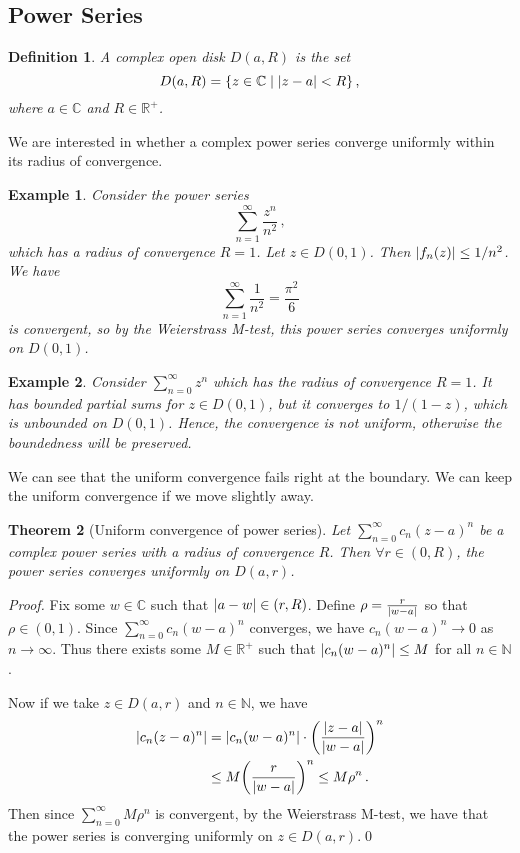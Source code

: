 \documentclass{article}
\theoremstyle{plain}\theoremheaderfont{\normalfont\itshape}\theorembodyfont{\rmfamily}\theoremseparator{.}\newtheorem*{rem}{Remark}\newtheorem*{ex}{Example}\newtheorem*{proof}{Proof}\newtheorem*{altp}{Alternative proof}
\theoremstyle{plain}\theoremheaderfont{\normalfont\bfseries}\theorembodyfont{\rmfamily}\theoremseparator{.}\newtheorem{thm}{Theorem}[section]\newtheorem{lem}[thm]{Lemma}\newtheorem{prop}[thm]{Proposition}\newtheorem*{cor}{Corollary}\newtheorem{defn}[thm]{Definition}\newtheorem{clm}[thm]{Claim}\newtheorem{clminproof}{Claim}
\theoremstyle{break}\theoremheaderfont{\normalfont\itshape}\theorembodyfont{\rmfamily}\theoremseparator{.\medskip}\newtheorem*{proofskip}{Proof}\newtheorem*{exs}{Examples}\newtheorem*{rems}{Remarks}
\theoremstyle{break}\theoremheaderfont{\normalfont\bfseries}\theorembodyfont{\rmfamily}\theoremseparator{.\medskip}\newtheorem{lemskip}[thm]{Lemma}\newtheorem{defnskip}[thm]{Definition}\newtheorem{propskip}[thm]{Proposition}\newtheorem{thmskip}[thm]{Theorem}
\newcommand{\qed}{\hfill\ensuremath{\Box}}
\begin{document}
    \subsection{Power Series}
    \begin{defn}
        A complex open disk \(D(a,R)\) is the set
        \[D(a,R)=\{z\in\mathbb{C}\mid\abs{z-a}<R\}\,,\]
        where \(a\in\mathbb{C}\) and \(R\in\mathbb{R}^+\).
    \end{defn}

    We are interested in whether a complex power series converge uniformly within its radius of convergence.

    \begin{ex}
        Consider the power series
        \[\sum_{n=1}^{\infty}\frac{z^n}{n^2}\,,\]
        which has a radius of convergence \(R=1\). Let \(z\in D(0,1)\). Then \(\abs{f_n(z)}\le 1/n^2\). We have
        \[\sum_{n=1}^{\infty}\frac{1}{n^2}=\frac{\pi^2}{6}\]
        is convergent, so by the Weierstrass M-test, this power series converges uniformly on \(D(0,1)\). 
    \end{ex}

    \begin{ex}
        Consider \(\sum_{n=0}^{\infty}z^n\) which has the radius of convergence \(R=1\). It has bounded partial sums for \(z\in D(0,1)\), but it converges to \(1/(1-z)\), which is unbounded on \(D(0,1)\). Hence, the convergence is not uniform, otherwise the boundedness will be preserved.
    \end{ex}

    We can see that the uniform convergence fails right at the boundary. We can keep the uniform convergence if we move slightly away.

    \begin{thm}[Uniform convergence of power series]
        Let \(\sum_{n=0}^{\infty}c_n(z-a)^n\) be a complex power series with a radius of convergence \(R\). Then \(\forall r\in (0,R)\), the power series converges uniformly on \(D(a,r)\).
    \end{thm}
    \begin{proof}
        Fix some \(w\in \mathbb{C}\) such that \(\abs{a-w}\in(r,R)\). Define \(\rho=\frac{r}{\abs{w-a}}\) so that \(\rho\in(0,1)\). Since \(\sum_{n=0}^{\infty}c_n(w-a)^n\) converges, we have \(c_n(w-a)^n\to 0\) as \(n\to\infty\). Thus there exists some \(M\in\mathbb{R}^+\) such that \(\abs{c_n(w-a)^n}\le M\) for all \(n\in\mathbb{N}\).

        Now if we take \(z\in D(a,r)\) and \(n\in\mathbb{N}\), we have
        \begin{align*}
            \abs{c_n(z-a)^n}&=\abs{c_n(w-a)^n}\cdot\qty(\frac{\abs{z-a}}{\abs{w-a}})^n\\
            &\le M\qty(\frac{r}{\abs{w-a}})^n\le M\rho^n\,.
        \end{align*}
        Then since \(\sum_{n=0}^{\infty}M\rho^n\) is convergent, by the Weierstrass M-test, we have that the power series is converging uniformly on \(z\in D(a,r)\).\qed
    \end{proof}
\end{document}

